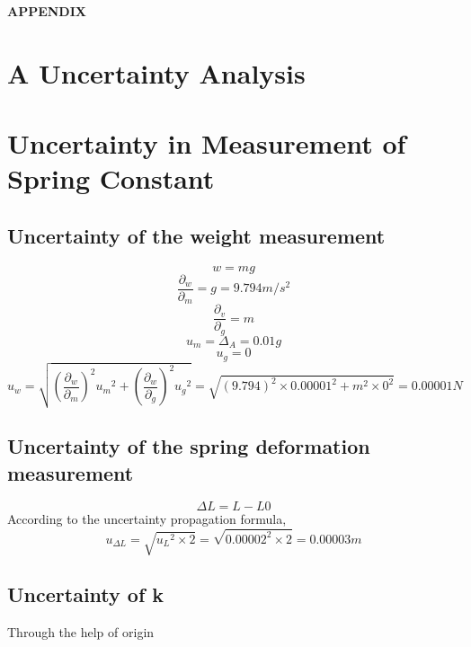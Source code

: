 \documentclass[12pt,a4paper]{article}
\begin{document}

\newpage
{\LARGE\textbf{APPENDIX}}
\setcounter{section}{0}
\renewcommand\thesection{\Alph{section}}

\section{A Uncertainty Analysis}
\section{Uncertainty in Measurement of Spring Constant}
\subsection{Uncertainty of the weight measurement}
$$w=mg$$
$$\frac{\partial_w}{\partial_m}=g=9.794m/s^2$$
$$\frac{\partial_v}{\partial_g}=m$$
$$u_m=\Delta_A=0.01g$$
$$u_g=0$$
$$u_w=\sqrt{(\frac{\partial_w}{\partial_m})^2{u_m}^2+(\frac{\partial_w}{\partial_g})^2{u_g}^2}=\sqrt{(9.794)^2\times0.00001^2+m^2 \times 0^2}=0.00001N$$
\subsection{Uncertainty of the spring deformation measurement}
$$\Delta L=L-L0$$
According to the uncertainty propagation formula,
$$u_{\Delta L}=\sqrt{{u_L}^2\times 2}=\sqrt{0.00002^2\times 2}=0.00003m$$
\subsection{Uncertainty of k}
Through the help of origin
\end{document}

